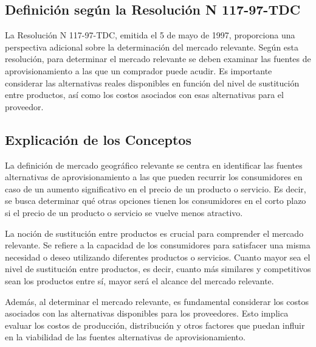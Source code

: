 \documentclass[
  letterpaper,
  DIV=11,
  numbers=noendperiod]{scrartcl}
\begin{document}
\hypertarget{definiciuxf3n-seguxfan-la-resoluciuxf3n-n-117-97-tdc}{%
\subsection{Definición según la Resolución N
117-97-TDC}\label{definiciuxf3n-seguxfan-la-resoluciuxf3n-n-117-97-tdc}}

La Resolución N 117-97-TDC, emitida el 5 de mayo de 1997, proporciona
una perspectiva adicional sobre la determinación del mercado relevante.
Según esta resolución, para determinar el mercado relevante se deben
examinar las fuentes de aprovisionamiento a las que un comprador puede
acudir. Es importante considerar las alternativas reales disponibles en
función del nivel de sustitución entre productos, así como los costos
asociados con esas alternativas para el proveedor.

\hypertarget{explicaciuxf3n-de-los-conceptos}{%
\subsection{Explicación de los
Conceptos}\label{explicaciuxf3n-de-los-conceptos}}

La definición de mercado geográfico relevante se centra en identificar
las fuentes alternativas de aprovisionamiento a las que pueden recurrir
los consumidores en caso de un aumento significativo en el precio de un
producto o servicio. Es decir, se busca determinar qué otras opciones
tienen los consumidores en el corto plazo si el precio de un producto o
servicio se vuelve menos atractivo.

La noción de sustitución entre productos es crucial para comprender el
mercado relevante. Se refiere a la capacidad de los consumidores para
satisfacer una misma necesidad o deseo utilizando diferentes productos o
servicios. Cuanto mayor sea el nivel de sustitución entre productos, es
decir, cuanto más similares y competitivos sean los productos entre sí,
mayor será el alcance del mercado relevante.

Además, al determinar el mercado relevante, es fundamental considerar
los costos asociados con las alternativas disponibles para los
proveedores. Esto implica evaluar los costos de producción, distribución
y otros factores que puedan influir en la viabilidad de las fuentes
alternativas de aprovisionamiento.


\printbibliography
\end{document}

